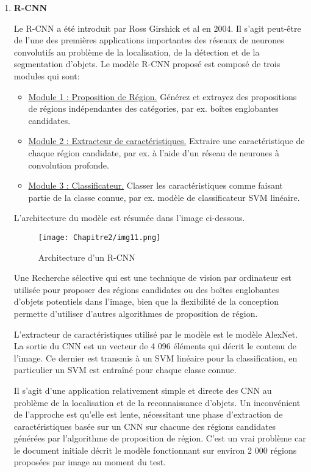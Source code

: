 \begin{enumerate}
 \item  \textbf{R-CNN}\cite{rcnn_paper}
 
Le R-CNN a été introduit par Ross Girshick et al en 2004. Il s'agit peut-être de l'une des premières applications importantes des réseaux de neurones convolutifs au problème de la localisation, de la détection et de la segmentation d'objets. Le modèle R-CNN proposé est composé de trois modules qui sont:
\begin{itemize}
\item \underline{Module 1 : Proposition de Région.} Générez et extrayez des propositions de régions indépendantes des catégories, par ex. boîtes englobantes candidates.
\item \underline{Module 2 : Extracteur de caractéristiques.} Extraire une caractéristique de chaque région candidate, par ex. à l'aide d'un réseau de neurones à convolution profonde.
\item \underline{Module 3 : Classificateur.} Classer les caractéristiques comme faisant partie de la classe connue, par ex. modèle de classificateur SVM linéaire.
\end{itemize}
 
L'architecture du modèle est résumée dans l'image ci-dessous.
 \begin{figure}[H]
          \centering
          \texttt{[image: Chapitre2/img11.png]}
          \caption{Architecture d'un R-CNN \cite{rcnn_paper}}
          \label{img11}
          \end{figure}

Une Recherche sélective qui est une technique de vision par ordinateur est utilisée pour proposer des régions candidates ou des boîtes englobantes d'objets potentiels dans l'image, bien que la flexibilité de la conception permette d'utiliser d'autres algorithmes de proposition de région.

L'extracteur de caractéristiques utilisé par le modèle est le modèle AlexNet. La sortie du CNN est un vecteur de 4 096 éléments qui décrit le contenu de l'image. Ce dernier est transmis à un SVM linéaire pour la classification, en particulier un SVM est entraîné pour chaque classe connue.

Il s'agit d'une application relativement simple et directe des CNN au problème de la localisation et de la reconnaissance d'objets. Un inconvénient de l'approche est qu'elle est lente, nécessitant une phase d'extraction de caractéristiques basée sur un CNN sur chacune des régions candidates générées par l'algorithme de proposition de région. C'est un vrai problème car le document initiale décrit le modèle fonctionnant sur environ 2 000 régions proposées par image au moment du test.
          

\end{enumerate}

